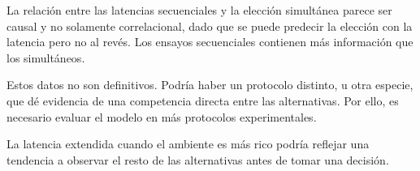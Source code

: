 \documentclass[a4paper,12pt]{article}
\begin{document}
La relación entre las latencias secuenciales y la elección simultánea parece ser causal y no solamente correlacional, dado que se puede predecir la elección con la latencia pero no al revés. Los ensayos secuenciales contienen más información que los simultáneos.

Estos datos no son definitivos. Podría haber un protocolo distinto, u otra especie, que dé evidencia de una competencia directa entre las alternativas. Por ello, es necesario evaluar el modelo en más protocolos experimentales.

La latencia extendida cuando el ambiente es más rico podría reflejar una tendencia a observar el resto de las alternativas antes de tomar una decisión.


\end{document}

